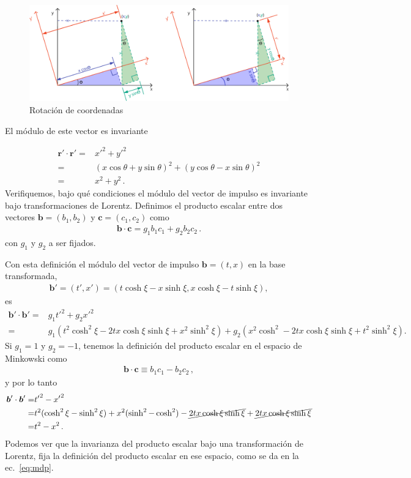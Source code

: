 \documentclass[11pt,a4paper]{article}
\begin{document}
\begin{figure}
    \centering
    \includegraphics[width=1\linewidth]{so2}
    \caption{Rotación de coordenadas}
    \label{fig:rot}
\end{figure}

El módulo de este vector es invariante

\begin{align*}
    \boldsymbol{r}'\cdot\boldsymbol{r}' =&{x'}^2+{y'}^2  \\
    =&(x\cos\theta+y\sin\theta)^2+(y\cos\theta-x\sin\theta)^2\\
    = & x^2+y^2\,.
\end{align*}
Verifiquemos, bajo qué condiciones el módulo del vector de impulso es invariante bajo transformaciones de Lorentz. Definimos el producto escalar entre dos vectores
$\boldsymbol{b} = (b_1,b_2)$ y $\boldsymbol{c} = (c_1,c_2) $ como
\begin{align}
    \boldsymbol{b} \cdot \boldsymbol{c} = g_{1} b_1 c_1 + g_{2} b_2 c_2\,.
\end{align}
con $g_{1}$ y $g_{2}$ a ser fijados. 

Con esta definición el módulo del vector de impulso $\boldsymbol{b} = (t,x)$ en la base transformada, 
\begin{align*}
\boldsymbol{b}' = (t',x') = (t\cosh\xi - x\sinh\xi, x\cosh\xi -t\sinh\xi),
\end{align*}
es
\begin{align*}
    \boldsymbol{b}'\cdot\boldsymbol{b}' =& 
g_{1} {t'}^2 + g_{2} {x'}^2 \\
=& g_1\left(t^2\cosh^2\xi -2 tx\cosh\xi\sinh\xi+x^2\sinh^2\xi\right)+
g_2\left(x^2\cosh^2-2tx\cosh\xi\sinh\xi + t^2\sinh^2\xi\right).
\end{align*}
Si $g_1=1$ y $g_2=-1$, tenemos la definición del producto escalar en el espacio de Minkowski como
\begin{align}
\label{eq:mdp}
    \boldsymbol{b} \cdot \boldsymbol{c} \equiv b_1 c_1 - b_2 c_2\,,
\end{align}
y por lo tanto
\begin{align*}
    \boldsymbol{b}'\cdot\boldsymbol{b}' =& 
{t'}^2 - {x'}^2 \\
=& t^2(\cosh^2\xi-\sinh^2\xi)+x^2(\sinh^2-\cosh^2) -\cancel{2 tx\cosh\xi\sinh\xi}+\cancel{2 tx\cosh\xi\sinh\xi}\\
=&t^2 - x^2\,.
\end{align*}
Podemos ver que la invarianza del producto escalar bajo una transformación de Lorentz, fija la definición del producto escalar en ese espacio, como se da en la ec.~\eqref{eq:mdp}.
\end{document}
